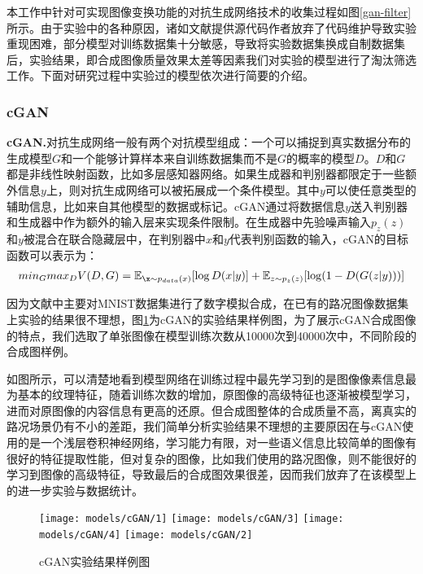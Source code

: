 本工作中针对可实现图像变换功能的对抗生成网络技术的收集过程如图\ref{gan-filter}所示。由于实验中的各种原因，诸如文献提供源代码作者放弃了代码维护导致实验重现困难，部分模型对训练数据集十分敏感，导致将实验数据集换成自制数据集后，实验结果，即合成图像质量效果太差等因素我们对实验的模型进行了淘汰筛选工作。下面对研究过程中实验过的模型依次进行简要的介绍。

\subsubsection{cGAN}

\textbf{cGAN.}\cite{cGAN}\quad 对抗生成网络一般有两个对抗模型组成：一个可以捕捉到真实数据分布的生成模型$G$和一个能够计算样本来自训练数据集而不是$G$的概率的模型$D$。$D$和$G$都是非线性映射函数，比如多层感知器网络。如果生成器和判别器都限定于一些额外信息$y$上，则对抗生成网络可以被拓展成一个条件模型。其中$y$可以使任意类型的辅助信息，比如来自其他模型的数据或标记。cGAN通过将数据信息$y$送入判别器和生成器中作为额外的输入层来实现条件限制。在生成器中先验噪声输入$p_z(z)$和$y$被混合在联合隐藏层中，在判别器中$x$和$y$代表判别函数的输入，cGAN的目标函数可以表示为：
\begin{gather}
    min_G max_D V(D,G)=\mathbb{E}_{\x\sim p_{data}(x)}[\log D(x|y)]+\mathbb{E}_{z\sim p_z(z)}[\log(1-D(G(z|y)))]
\end{gather}

因为文献中\cite{cGAN}主要对MNIST\cite{mnist}数据集进行了数字模拟合成，在已有的路况图像数据集上实验的结果很不理想，图\ref{fig:cgan}为cGAN的实验结果样例图，为了展示cGAN合成图像的特点，我们选取了单张图像在模型训练次数从10000次到40000次中，不同阶段的合成图样例。

如图所示，可以清楚地看到模型网络在训练过程中最先学习到的是图像像素信息最为基本的纹理特征，随着训练次数的增加，原图像的高级特征也逐渐被模型学习，进而对原图像的内容信息有更高的还原。但合成图整体的合成质量不高，离真实的路况场景仍有不小的差距，我们简单分析实验结果不理想的主要原因在与cGAN使用的是一个浅层卷积神经网络，学习能力有限，对一些语义信息比较简单的图像有很好的特征提取性能，但对复杂的图像，比如我们使用的路况图像，则不能很好的学习到图像的高级特征，导致最后的合成图效果很差，因而我们放弃了在该模型上的进一步实验与数据统计。 

\begin{figure}[h]
    \centering
    \texttt{[image: models/cGAN/1]}
    \texttt{[image: models/cGAN/3]}
    \texttt{[image: models/cGAN/4]}
    \texttt{[image: models/cGAN/2]}
    \caption{cGAN实验结果样例图}
    \label{fig:cgan}
\end{figure}

